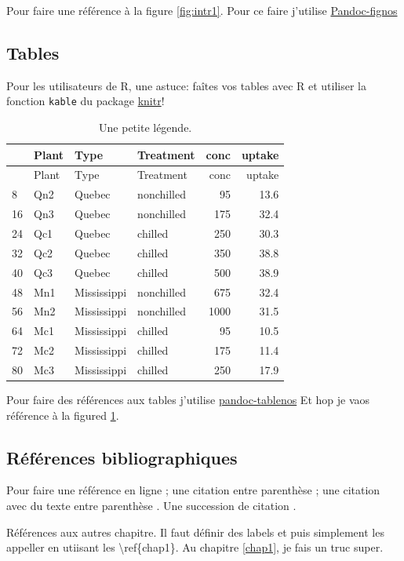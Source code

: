 Pour faire une référence à la figure \ref{fig:intr1}. Pour ce faire
j'utilise \href{https://github.com/tomduck/pandoc-fignos}{Pandoc-fignos}

\subsection*{Tables}\label{tables}

Pour les utilisateurs de R, une astuce: faîtes vos tables avec R et
utiliser la fonction \texttt{kable} du package
\href{http://yihui.name/knitr/}{knitr}!

\begin{longtable}[]{@{}llllrr@{}}
\caption{Une petite légende. \label{tbl:intr_1}}\tabularnewline
\toprule
& Plant & Type & Treatment & conc & uptake\tabularnewline
\midrule
\endfirsthead
\toprule
& Plant & Type & Treatment & conc & uptake\tabularnewline
\midrule
\endhead
8 & Qn2 & Quebec & nonchilled & 95 & 13.6\tabularnewline
16 & Qn3 & Quebec & nonchilled & 175 & 32.4\tabularnewline
24 & Qc1 & Quebec & chilled & 250 & 30.3\tabularnewline
32 & Qc2 & Quebec & chilled & 350 & 38.8\tabularnewline
40 & Qc3 & Quebec & chilled & 500 & 38.9\tabularnewline
48 & Mn1 & Mississippi & nonchilled & 675 & 32.4\tabularnewline
56 & Mn2 & Mississippi & nonchilled & 1000 & 31.5\tabularnewline
64 & Mc1 & Mississippi & chilled & 95 & 10.5\tabularnewline
72 & Mc2 & Mississippi & chilled & 175 & 11.4\tabularnewline
80 & Mc3 & Mississippi & chilled & 250 & 17.9\tabularnewline
\bottomrule
\end{longtable}

Pour faire des références aux tables j'utilise
\href{https://github.com/tomduck/pandoc-tablenos}{pandoc-tablenos} Et
hop je vaos référence à la figured \ref{tbl:intr_1}.

\subsection*{Références
bibliographiques}\label{ruxe9fuxe9rences-bibliographiques}

Pour faire une référence en ligne \citet{Cazelles2016a}; une citation
entre parenthèse \citep{Cazelles2016a}; une citation avec du texte entre
parenthèse \citep[voir][]{Cazelles2016a}. Une succession de citation
\citep{Cazelles2016a, MacArthur1967, DeRuiter1995}.

Références aux autres chapitre. Il faut définir des labels et puis
simplement les appeller en utiisant les \textbackslash{}ref\{chap1\}. Au
chapitre \ref{chap1}, je fais un truc super.

